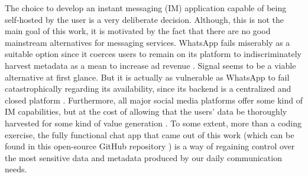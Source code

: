 The choice to develop an instant messaging (IM) application capable of being self-hosted by the user is a very deliberate decision. Although, this is not the main goal of this work, it is motivated by the fact that there are no good mainstream alternatives for messaging services. WhatsApp fails miserably as a suitable option since it coerces users to remain on its platform to indiscriminately harvest metadata as a mean to increase ad revenue \cite{Kumar2021}. Signal seems to be a viable alternative at first glance. But it is actually as vulnerable as WhatsApp to fail catastrophically regarding its availability, since its backend is a centralized and closed platform \cite{Hodgson2020}. Furthermore, all major social media platforms offer some kind of IM capabilities, but at the cost of allowing that the users' data be thoroughly harvested for some kind of value generation \cite{socialmedia2017}. To some extent, more than a coding exercise, the fully functional chat app that came out of this work (which can be found in this open-source GitHub repository \cite{Rodriguez2022}) is a way of regaining control over the most sensitive data and metadata produced by our daily communication needs.